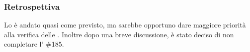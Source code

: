 \subsubsection{Retrospettiva}
Lo  è andato quasi come previsto, ma sarebbe opportuno dare maggiore priorità alla verifica delle . Inoltre dopo una breve discussione, è stato deciso di non completare l' \#185.